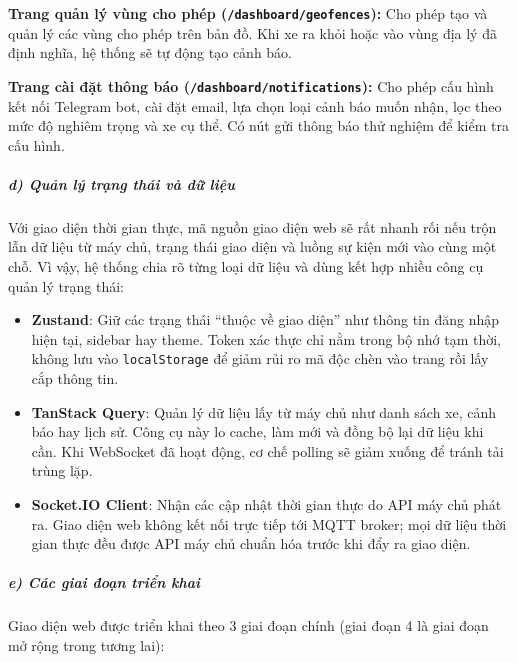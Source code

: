 \documentclass[a4paper]{extarticle}
\providecommand{\tightlist}{%
  \setlength{\itemsep}{0pt}\setlength{\parskip}{0pt}}
\begin{document}
\textbf{Trang quản lý vùng cho phép (\texttt{/dashboard/geofences}):} Cho
phép tạo và quản lý các vùng cho phép trên bản đồ. Khi xe ra
khỏi hoặc vào vùng địa lý đã định nghĩa, hệ thống sẽ tự động tạo cảnh
báo.

\textbf{Trang cài đặt thông báo (\texttt{/dashboard/notifications}):}
Cho phép cấu hình kết nối Telegram bot, cài đặt email, lựa chọn loại
cảnh báo muốn nhận, lọc theo mức độ nghiêm trọng và xe cụ thể. Có nút
gửi thông báo thử nghiệm để kiểm tra cấu hình.

\subparagraph{d) Quản lý trạng thái và dữ
liệu}\label{d-quux1ea3n-luxfd-trux1ea1ng-thuxe1i-vuxe0-dux1eef-liux1ec7u}

Với giao diện thời gian thực, mã nguồn giao diện web sẽ rất nhanh rối nếu
trộn lẫn dữ liệu từ máy chủ, trạng thái giao diện và luồng sự kiện mới
vào cùng một chỗ. Vì vậy, hệ thống chia rõ từng loại dữ liệu và dùng kết
hợp nhiều công cụ quản lý trạng thái:

\begin{itemize}
\tightlist
\item
  \textbf{Zustand}: Giữ các trạng thái ``thuộc về giao diện'' như thông
  tin đăng nhập hiện tại, sidebar hay theme. Token xác thực chỉ nằm trong
  bộ nhớ tạm thời, không lưu vào \texttt{localStorage} để giảm rủi ro mã độc chèn
  vào trang rồi lấy cắp thông tin.
\item
  \textbf{TanStack Query}: Quản lý dữ liệu lấy từ máy chủ như danh sách
  xe, cảnh báo hay lịch sử. Công cụ này lo cache, làm mới và đồng bộ lại
  dữ liệu khi cần. Khi WebSocket đã hoạt động, cơ chế polling sẽ giảm
  xuống để tránh tải trùng lặp.
\item
  \textbf{Socket.IO Client}: Nhận các cập nhật thời gian thực do API máy
  chủ phát ra. Giao diện web không kết nối trực tiếp tới MQTT broker;
  mọi dữ liệu thời gian thực đều được API máy chủ chuẩn hóa trước khi
  đẩy ra giao diện.
\end{itemize}

\subparagraph{e) Các giai đoạn triển
khai}\label{e-cuxe1c-giai-ux111oux1ea1n-triux1ec3n-khai}

Giao diện web được triển khai theo 3 giai đoạn chính (giai đoạn 4 là giai đoạn mở
rộng trong tương lai):
\end{document}

